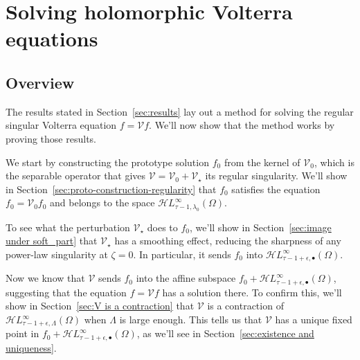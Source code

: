\documentclass{article}
\theoremstyle{plain}
\newcommand{\singexp}[2]{\mathcal{H}L^\infty_{#1, #2}}
\newcommand{\singexpalg}[1]{\singexp{#1}{\bullet}}
\newcommand{\expHoloL}[2]{\mathcal{H}L^{#1}_{#2}} %
\newcommand{\volterra}{\mathcal{V}}
\newcommand{\hardpart}{\mathcal{V}_0}
\newcommand{\softpart}{\mathcal{V}_\star}
\newcommand{\solwhole}{f}
\newcommand{\solproto}{f_0}
\newcommand{\domain}{\Omega}
\begin{document}

\section{Solving holomorphic Volterra equations}
\subsection{Overview}
The results stated in Section~\ref{sec:results} lay out a method for solving the regular singular Volterra equation $\solwhole = \volterra \solwhole$. We'll now show that the method works by proving those results.

We start by constructing the prototype solution $\solproto$ from the kernel of $\hardpart$, which is the separable operator that gives $\volterra = \hardpart + \softpart$ its regular singularity. We'll show in Section~\ref{sec:proto-construction-regularity} that $\solproto$ satisfies the equation $\solproto = \hardpart \solproto$ and belongs to the space $\singexp{\tau-1}{\lambda_0}(\domain)$.

To see what the perturbation $\softpart$ does to $\solproto$, we'll show in Section~\ref{sec:image under soft_part} that $\softpart$ has a smoothing effect, reducing the sharpness of any power-law singularity at $\zeta = 0$. In particular, it sends $\solproto$ into $\singexpalg{\tau-1+\epsilon}(\domain)$.

Now we know that $\volterra$ sends $\solproto$ into the affine subspace $\solproto + \singexpalg{\tau-1+\epsilon}(\domain)$, suggesting that the equation $\solwhole = \volterra \solwhole$ has a solution there. To confirm this, we'll show in Section~\ref{sec:V is a contraction} that $\volterra$ is a contraction of $\singexp{\tau-1+\epsilon}{\Lambda}(\domain)$ when $\Lambda$ is large enough. This tells us that $\volterra$ has a unique fixed point in $\solproto + \singexpalg{\tau-1+\epsilon}(\domain)$, as we'll see in Section~\ref{sec:existence and uniqueness}.
\end{document}
